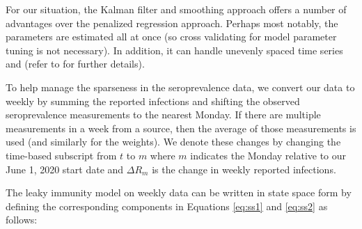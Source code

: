 \documentclass{article}
\begin{document}
For our situation, the Kalman filter and smoothing approach offers a number of
advantages over the penalized regression approach. Perhaps most notably,
 the parameters are estimated all at once (so cross validating for model
parameter tuning is not necessary). In addition, it can handle unevenly spaced
time series and (refer to \citealp{durbin2012time} for further details).

To help manage the sparseness in the seroprevalence data, we convert our data 
to weekly by summing the reported infections and shifting the observed 
seroprevalence measurements to the nearest Monday. If there are multiple 
measurements in a week from a source, then the average of those 
measurements is used (and similarly for the weights). We denote these changes by 
changing the time-based subscript from $t$ to $m$ where $m$ indicates the Monday 
relative to our June 1, 2020 start date and $\Delta R_m$ is the change in weekly 
reported infections.

The leaky immunity model on weekly data can be written in state space form by 
defining the corresponding components in Equations \ref{eq:ss1} and 
\ref{eq:ss2} as follows:

\end{document}
